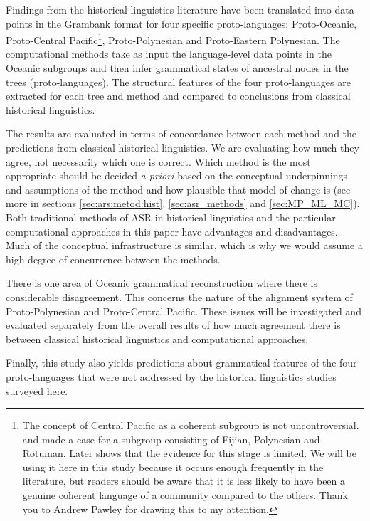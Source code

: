 \documentclass[12pt,letterpaper]{article}
\begin{document}
Findings from the historical linguistics literature have been translated into data points in the Grambank format for four specific proto-languages: Proto-Oceanic, Proto-Central Pacific\footnote{The concept of Central Pacific as a coherent subgroup is not uncontroversial. \citet{grace1958position} and \citet{pawley1972internal} made a case for a subgroup consisting of Fijian, Polynesian and Rotuman. Later \citet{geraghty1996} shows that the evidence for this stage is limited. We will be using it here in this study because it occurs enough frequently in the literature, but readers should be aware that it is less likely to have been a genuine coherent language of a community compared to the others. Thank you to Andrew Pawley for drawing this to my attention.}, Proto-Polynesian and Proto-Eastern Polynesian. The computational methods take as input the language-level data points in the Oceanic subgroups and then infer grammatical states of ancestral nodes in the trees (proto-languages). The structural features of the four proto-languages are extracted for each tree and method and compared to conclusions from classical historical linguistics. 

The results are evaluated in terms of concordance between each method and the predictions from classical historical linguistics. We are evaluating how much they agree, not necessarily which one is correct. Which method is the most appropriate should be decided \emph{a priori} based on the conceptual underpinnings and assumptions of the method and how plausible that model of change is (see more in sections \ref{sec:ars:metod:hist}, \ref{sec:asr_methods} and \ref{sec:MP_ML_MC}). Both traditional methods of ASR in historical linguistics and the particular computational approaches in this paper have advantages and disadvantages. Much of the conceptual infrastructure is similar, which is why we would assume a high degree of concurrence between the methods. 

There is one area of Oceanic grammatical reconstruction where there is considerable disagreement. This concerns the nature of the alignment system of Proto-Polynesian and Proto-Central Pacific. These issues will be investigated and evaluated separately from the overall results of how much agreement there is between classical historical linguistics and computational approaches.

Finally, this study also yields predictions about grammatical features of the four proto-languages that were not addressed by the historical linguistics studies surveyed here.
\end{document}
